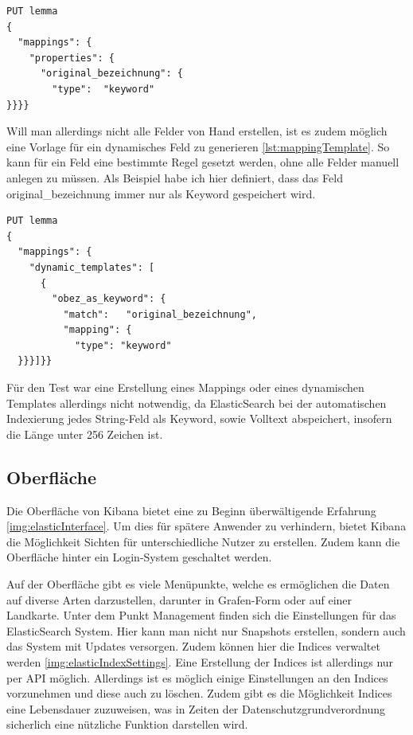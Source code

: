 \begin{lstlisting}[language=xml, frame=single, label={lst:mapping}] 
PUT lemma
{
  "mappings": {
    "properties": {
      "original_bezeichnung": {
        "type":  "keyword"
}}}}
\end{lstlisting}

Will man allerdings nicht alle Felder von Hand erstellen, ist es zudem möglich eine Vorlage für ein dynamisches Feld zu generieren \ref{lst:mappingTemplate}. So kann für ein Feld eine bestimmte Regel gesetzt werden, ohne alle Felder manuell anlegen zu müssen. Als Beispiel habe ich hier definiert, dass das Feld original\_bezeichnung immer nur als Keyword gespeichert wird.

\begin{lstlisting}[language=xml, frame=single, label={lst:mappingTemplate}] 
PUT lemma
{
  "mappings": {
    "dynamic_templates": [
      {
        "obez_as_keyword": {
          "match":   "original_bezeichnung",
          "mapping": {
            "type": "keyword"
  }}}]}}
\end{lstlisting}

Für den Test war eine Erstellung eines Mappings oder eines dynamischen Templates allerdings nicht notwendig, da ElasticSearch bei der automatischen Indexierung jedes String-Feld als Keyword, sowie Volltext abspeichert, insofern die Länge unter 256 Zeichen ist.

\subsection{Oberfläche}

Die Oberfläche von Kibana bietet eine zu Beginn überwältigende Erfahrung \ref{img:elasticInterface}. Um dies für spätere Anwender zu verhindern, bietet Kibana die Möglichkeit Sichten für unterschiedliche Nutzer zu erstellen. Zudem kann die Oberfläche hinter ein Login-System geschaltet werden.

Auf der Oberfläche gibt es viele Menüpunkte, welche es ermöglichen die Daten auf diverse Arten darzustellen, darunter in Grafen-Form oder auf einer Landkarte. Unter dem Punkt Management finden sich die Einstellungen für das ElasticSearch System. Hier kann man nicht nur Snapshots erstellen, sondern auch das System mit Updates versorgen. Zudem können hier die Indices verwaltet werden \ref{img:elasticIndexSettings}. Eine Erstellung der Indices ist allerdings nur per API möglich. Allerdings ist es möglich einige Einstellungen an den Indices vorzunehmen und diese auch zu löschen. Zudem gibt es die Möglichkeit Indices eine Lebensdauer zuzuweisen, was in Zeiten der Datenschutzgrundverordnung sicherlich eine nützliche Funktion darstellen wird. 


